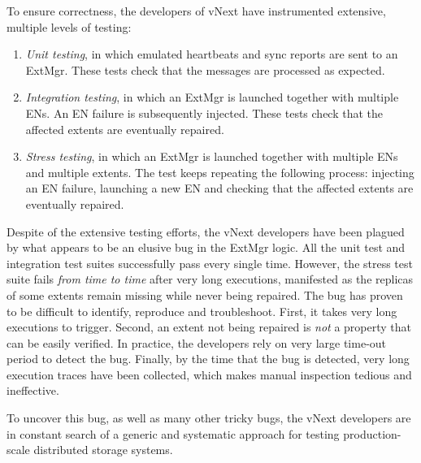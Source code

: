 To ensure correctness, the developers of vNext have instrumented extensive, multiple levels of testing:
\begin{enumerate}
\item \emph{Unit testing}, in which emulated heartbeats and sync reports are sent to an ExtMgr. These tests check that the messages are processed as expected.

\item \emph{Integration testing}, in which an ExtMgr is launched together with multiple ENs. An EN failure is subsequently injected. These tests check that the affected extents are eventually repaired.

\item \emph{Stress testing}, in which an ExtMgr is launched together with multiple ENs and multiple extents. The test keeps repeating the following process: injecting an EN failure, launching a new EN and checking that the affected extents are eventually repaired.
\end{enumerate}

\noindent
Despite of the extensive testing efforts, the vNext developers have been plagued by what appears to be an elusive bug in the ExtMgr logic. All the unit test and integration test suites successfully pass every single time. However, the stress test suite fails {\em from time to time} after very long executions, manifested as the replicas of some extents remain missing while never being repaired. The bug has proven to be difficult to identify, reproduce and troubleshoot. First, it takes very long executions to trigger. Second, an extent not being repaired is {\em not} a property that can be easily verified. In practice, the developers rely on very large time-out period to detect the bug. Finally, by the time that the bug is detected, very long execution traces have been collected, which makes manual inspection tedious and ineffective.

To uncover this bug, as well as many other tricky bugs, the vNext developers are in constant search of a generic and systematic approach for testing production-scale distributed storage systems.

